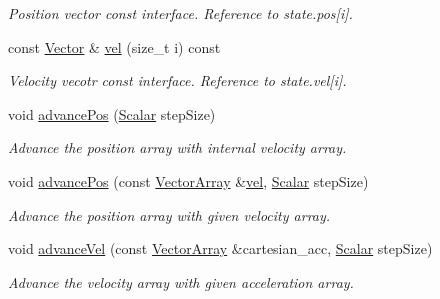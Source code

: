 \begin{DoxyCompactItemize}
\begin{DoxyCompactList}\small\item\em Position vector const interface. Reference to state.\+pos\mbox{[}i\mbox{]}. \end{DoxyCompactList}\item 
const \mbox{\hyperlink{class_space_h_1_1_vel_indep_particles_a61bbcfdb0dc7f99f3c68af69a755c935}{Vector}} \& \mbox{\hyperlink{class_space_h_1_1_vel_indep_chain_particles_a28464b3a1352cbab4a7a59a03b38ab85}{vel}} (size\+\_\+t i) const
\begin{DoxyCompactList}\small\item\em Velocity vecotr const interface. Reference to state.\+vel\mbox{[}i\mbox{]}. \end{DoxyCompactList}\item 
void \mbox{\hyperlink{class_space_h_1_1_vel_indep_chain_particles_a647d4861878b28d79b6aab00de12ab8d}{advance\+Pos}} (\mbox{\hyperlink{class_space_h_1_1_vel_indep_particles_aeb47d8131b30ed790320ff634f0d6af1}{Scalar}} step\+Size)
\begin{DoxyCompactList}\small\item\em Advance the position array with internal velocity array. \end{DoxyCompactList}\item 
void \mbox{\hyperlink{class_space_h_1_1_vel_indep_chain_particles_ae71e70b6374f8326b5ffb62d06284942}{advance\+Pos}} (const \mbox{\hyperlink{class_space_h_1_1_vel_indep_particles_aa9983058940249df8b00fa800e8cbad2}{Vector\+Array}} \&\mbox{\hyperlink{class_space_h_1_1_vel_indep_chain_particles_aadbc08f6cf8da3e46eb8d6c619e30c2f}{vel}}, \mbox{\hyperlink{class_space_h_1_1_vel_indep_particles_aeb47d8131b30ed790320ff634f0d6af1}{Scalar}} step\+Size)
\begin{DoxyCompactList}\small\item\em Advance the position array with given velocity array. \end{DoxyCompactList}\item 
void \mbox{\hyperlink{class_space_h_1_1_vel_indep_chain_particles_ae5253fbb69161c625f878de540618eb7}{advance\+Vel}} (const \mbox{\hyperlink{class_space_h_1_1_vel_indep_particles_aa9983058940249df8b00fa800e8cbad2}{Vector\+Array}} \&cartesian\+\_\+acc, \mbox{\hyperlink{class_space_h_1_1_vel_indep_particles_aeb47d8131b30ed790320ff634f0d6af1}{Scalar}} step\+Size)
\begin{DoxyCompactList}\small\item\em Advance the velocity array with given acceleration array. \end{DoxyCompactList}\item 

\end{DoxyCompactItemize}

